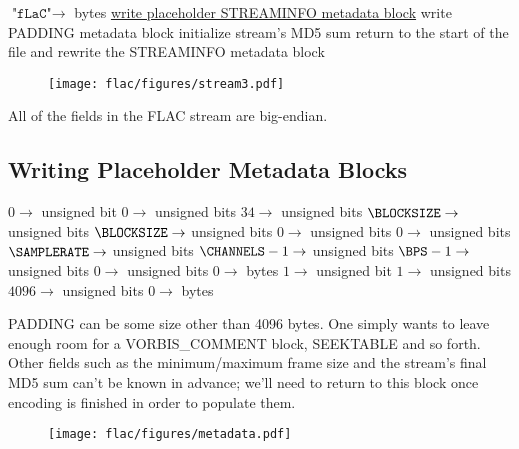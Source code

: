 $\texttt{"fLaC"} \rightarrow$  bytes\;
\hyperref[flac:write_placeholder_blocks]{write placeholder STREAMINFO metadata block}\;
write PADDING metadata block\;
initialize stream's MD5 sum\;
return to the start of the file and rewrite the STREAMINFO metadata block\;
\EALGORITHM
\begin{figure}[h]
\texttt{[image: flac/figures/stream3.pdf]}
\end{figure}
\par
\noindent
All of the fields in the FLAC stream are big-endian.

\clearpage

\subsection{Writing Placeholder Metadata Blocks}
\label{flac:write_placeholder_blocks}
$0 \rightarrow$  unsigned bit
$0 \rightarrow$  unsigned bits
$34 \rightarrow$  unsigned bits
$\BLOCKSIZE \rightarrow$  unsigned bits
$\BLOCKSIZE \rightarrow$  unsigned bits
$0 \rightarrow$  unsigned bits
$0 \rightarrow$  unsigned bits
$\SAMPLERATE \rightarrow$  unsigned bits\;
$\CHANNELS - 1 \rightarrow$  unsigned bits\;
$\BPS - 1 \rightarrow$  unsigned bits\;
$0 \rightarrow$  unsigned bits
$0 \rightarrow$  bytes
\BlankLine
\BlankLine
$1 \rightarrow$  unsigned bit
$1 \rightarrow$  unsigned bits
$4096 \rightarrow$  unsigned bits
$0 \rightarrow$  bytes
\EALGORITHM
\par
\noindent
PADDING can be some size other than 4096 bytes.
One simply wants to leave enough room for a VORBIS\_COMMENT block,
SEEKTABLE and so forth.
Other fields such as the minimum/maximum frame size
and the stream's final MD5 sum can't be known in advance;
we'll need to return to this block once encoding is finished
in order to populate them.
\begin{figure}[h]
\texttt{[image: flac/figures/metadata.pdf]}
\end{figure}


